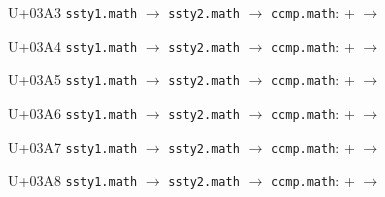 \documentclass{article}
\begin{document}
\begin{substitutions}
\goodbreak

U+03A3  \linebreak
    \texttt{ssty1.math} $\to$  \linebreak
    \texttt{ssty2.math} $\to$  \linebreak
\texttt{ccmp.math}:
\linebreak\null\quad{} \space +  \space $\to$  

\goodbreak

U+03A4  \linebreak
    \texttt{ssty1.math} $\to$  \linebreak
    \texttt{ssty2.math} $\to$  \linebreak
\texttt{ccmp.math}:
\linebreak\null\quad{} \space +  \space $\to$  

\goodbreak

U+03A5  \linebreak
    \texttt{ssty1.math} $\to$  \linebreak
    \texttt{ssty2.math} $\to$  \linebreak
\texttt{ccmp.math}:
\linebreak\null\quad{} \space +  \space $\to$  

\goodbreak

U+03A6  \linebreak
    \texttt{ssty1.math} $\to$  \linebreak
    \texttt{ssty2.math} $\to$  \linebreak
\texttt{ccmp.math}:
\linebreak\null\quad{} \space +  \space $\to$  

\goodbreak

U+03A7  \linebreak
    \texttt{ssty1.math} $\to$  \linebreak
    \texttt{ssty2.math} $\to$  \linebreak
\texttt{ccmp.math}:
\linebreak\null\quad{} \space +  \space $\to$  

\goodbreak

U+03A8  \linebreak
    \texttt{ssty1.math} $\to$  \linebreak
    \texttt{ssty2.math} $\to$  \linebreak
\texttt{ccmp.math}:
\linebreak\null\quad{} \space +  \space $\to$  


\end{substitutions}
\end{document}
